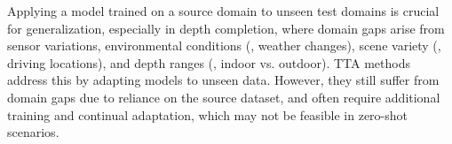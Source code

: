 Applying a model trained on a source domain to unseen test domains is crucial for generalization, especially in depth completion, where domain gaps arise from sensor variations, environmental conditions (\eg, weather changes), scene variety (\eg, driving locations), and depth ranges (\eg, indoor vs. outdoor). 
TTA methods~\cite{wang2021tent, wang2022continual, park2024testtime} address this by adapting models to unseen data.
However, they still suffer from domain gaps due to reliance on the source dataset, and often require additional training and continual adaptation, which may not be feasible in zero-shot scenarios.

